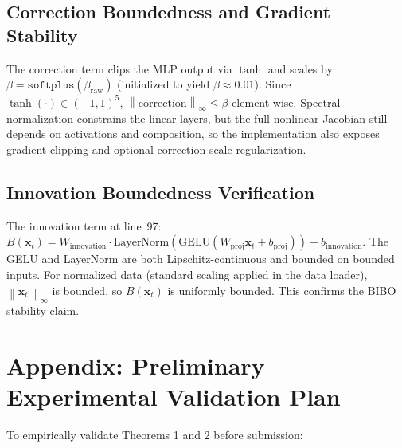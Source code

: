 \documentclass[11pt]{article}
\newcommand{\norm}[1]{\left\lVert#1\right\rVert}
\begin{document}
\subsection*{Correction Boundedness and Gradient Stability}

The correction term clips the MLP output via $\tanh$ and scales by $\beta = \texttt{softplus}(\beta_{\text{raw}})$ (initialized to yield $\beta \approx 0.01$). Since $\tanh(\cdot) \in (-1, 1)^5$, $\norm{\text{correction}}_\infty \leq \beta$ element-wise. Spectral normalization constrains the linear layers, but the full nonlinear Jacobian still depends on activations and composition, so the implementation also exposes gradient clipping and optional correction-scale regularization.

\subsection*{Innovation Boundedness Verification}

The innovation term at line~97: $B(\mathbf{x}_t) = W_{\text{innovation}} \cdot \text{LayerNorm}(\text{GELU}(W_{\text{proj}}\mathbf{x}_t + b_{\text{proj}})) + b_{\text{innovation}}$. The GELU and LayerNorm are both Lipschitz-continuous and bounded on bounded inputs. For normalized data (standard scaling applied in the data loader), $\norm{\mathbf{x}_t}_\infty$ is bounded, so $B(\mathbf{x}_t)$ is uniformly bounded. This confirms the BIBO stability claim.

\newpage
\section*{Appendix: Preliminary Experimental Validation Plan}

To empirically validate Theorems 1 and 2 before submission:
\end{document}
